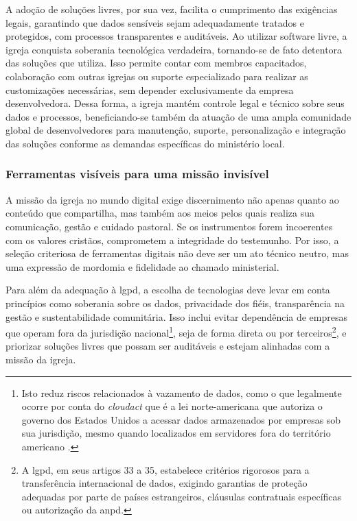 A adoção de soluções livres, por sua vez, facilita o cumprimento das exigências legais, garantindo que dados sensíveis sejam adequadamente tratados e protegidos, com processos transparentes e auditáveis. Ao utilizar software livre, a igreja conquista soberania tecnológica verdadeira, tornando-se de fato detentora das soluções que utiliza. Isso permite contar com membros capacitados, colaboração com outras igrejas ou suporte especializado para realizar as customizações necessárias, sem depender exclusivamente da empresa desenvolvedora. Dessa forma, a igreja mantém controle legal e técnico sobre seus dados e processos, beneficiando-se também da atuação de uma ampla comunidade global de desenvolvedores para manutenção, suporte, personalização e integração das soluções conforme as demandas específicas do ministério local.

\subsubsection{Ferramentas visíveis para uma missão invisível}

A missão da igreja no mundo digital exige discernimento não apenas quanto ao conteúdo que compartilha, mas também aos meios pelos quais realiza sua comunicação, gestão e cuidado pastoral. Se os instrumentos forem incoerentes com os valores cristãos, comprometem a integridade do testemunho. Por isso, a seleção criteriosa de ferramentas digitais não deve ser um ato técnico neutro, mas uma expressão de mordomia e fidelidade ao chamado ministerial.

Para além da adequação à \gls{lgpd}, a escolha de tecnologias deve levar em conta princípios como soberania sobre os dados, privacidade dos fiéis, transparência na gestão e sustentabilidade comunitária. Isso inclui evitar dependência de empresas que operam fora da jurisdição nacional\footnote{Isto reduz riscos relacionados à vazamento de dados, como o que legalmente ocorre por conta do \textit{\gls{cloudact}} que é a lei norte-americana que autoriza o governo dos Estados Unidos a acessar dados armazenados por empresas sob sua jurisdição, mesmo quando localizados em servidores fora do território americano \cite{harvard_cloudact_2018,brooklyn_cloudact_2020}.}, seja de forma direta ou por terceiros\footnote{A \gls{lgpd}, em seus artigos 33 a 35, estabelece critérios rigorosos para a transferência internacional de dados, exigindo garantias de proteção adequadas por parte de países estrangeiros, cláusulas contratuais específicas ou autorização da \gls{anpd}.}, e priorizar soluções livres que possam ser auditáveis e estejam alinhadas com a missão da igreja.

